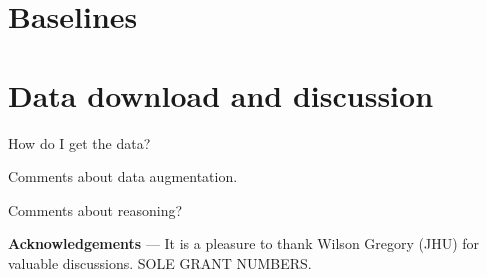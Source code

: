 \documentclass{article}
\renewcommand{\paragraph}[1]{\par\medskip\noindent\textbf{#1} ---}
\begin{document}
\section{Baselines}

\section{Data download and discussion}

How do I get the data?

Comments about data augmentation.

Comments about reasoning?

\paragraph{Acknowledgements}
It is a pleasure to thank
  Wilson Gregory (JHU)
for valuable discussions.
SOLE GRANT NUMBERS.


\raggedright

\end{document}
